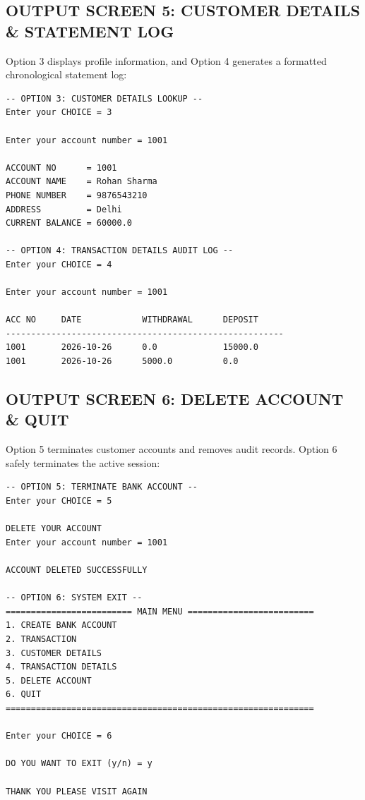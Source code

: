 \documentclass[12pt,a4paper]{article}
\begin{document}
\clearpage

\subsection*{OUTPUT SCREEN 5: CUSTOMER DETAILS \& STATEMENT LOG}
Option 3 displays profile information, and Option 4 generates a formatted chronological statement log:

\vspace{0.6em}
\begin{lstlisting}
-- OPTION 3: CUSTOMER DETAILS LOOKUP --
Enter your CHOICE = 3

Enter your account number = 1001

ACCOUNT NO      = 1001
ACCOUNT NAME    = Rohan Sharma
PHONE NUMBER    = 9876543210
ADDRESS         = Delhi
CURRENT BALANCE = 60000.0

-- OPTION 4: TRANSACTION DETAILS AUDIT LOG --
Enter your CHOICE = 4

Enter your account number = 1001

ACC NO     DATE            WITHDRAWAL      DEPOSIT        
-------------------------------------------------------
1001       2026-10-26      0.0             15000.0        
1001       2026-10-26      5000.0          0.0            
\end{lstlisting}

\clearpage

\subsection*{OUTPUT SCREEN 6: DELETE ACCOUNT \& QUIT}
Option 5 terminates customer accounts and removes audit records. Option 6 safely terminates the active session:

\vspace{0.6em}
\begin{lstlisting}
-- OPTION 5: TERMINATE BANK ACCOUNT --
Enter your CHOICE = 5

DELETE YOUR ACCOUNT
Enter your account number = 1001

ACCOUNT DELETED SUCCESSFULLY

-- OPTION 6: SYSTEM EXIT --
========================= MAIN MENU =========================
1. CREATE BANK ACCOUNT
2. TRANSACTION
3. CUSTOMER DETAILS
4. TRANSACTION DETAILS
5. DELETE ACCOUNT
6. QUIT
=============================================================

Enter your CHOICE = 6

DO YOU WANT TO EXIT (y/n) = y

THANK YOU PLEASE VISIT AGAIN
\end{lstlisting}
\end{document}

